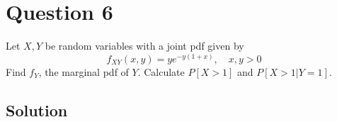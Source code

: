 \section*{Question 6}

Let \( X, Y \) be random variables with a joint pdf given by
\[
    f_{XY}(x,y)=ye^{-y(1+x)}, \quad x,y>0
\]
Find \(f_Y\), the marginal pdf of \(Y\).
Calculate \(P [X > 1]\) and \(P[X > 1|Y = 1]\).

\subsection*{Solution}
